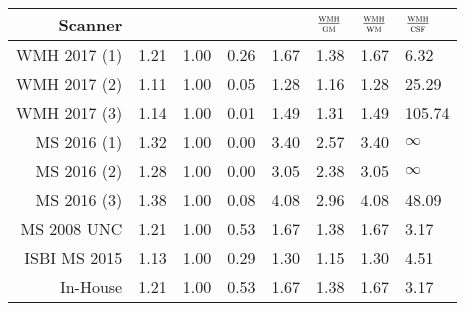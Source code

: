 \begin{tabu} to 0.7\textwidth{rX[c]X[c]X[c]X[c]X[c]X[c]X[c]}\toprule
Scanner      & \gm{} & \wm{} & \csf{} & \wmh{} & $\frac{\textsc{wmh}}{\textsc{gm}}$ & $\frac{\textsc{wmh}}{\textsc{wm}}$ & $\frac{\textsc{wmh}}{\textsc{csf}}$ \\\midrule
WMH 2017 (1) & 1.21 & 1.00 & 0.26 & 1.67 & 1.38 & 1.67 & 6.32\\
WMH 2017 (2) & 1.11 & 1.00 & 0.05 & 1.28 & 1.16 & 1.28 & 25.29\\
WMH 2017 (3) & 1.14 & 1.00 & 0.01 & 1.49 & 1.31 & 1.49 & 105.74\\
MS  2016 (1) & 1.32 & 1.00 & 0.00 & 3.40 & 2.57 & 3.40 & $\infty$\\
MS  2016 (2) & 1.28 & 1.00 & 0.00 & 3.05 & 2.38 & 3.05 & $\infty$\\
MS  2016 (3) & 1.38 & 1.00 & 0.08 & 4.08 & 2.96 & 4.08 & 48.09\\
MS  2008 UNC & 1.21 & 1.00 & 0.53 & 1.67 & 1.38 & 1.67 & 3.17\\
ISBI MS 2015 & 1.13 & 1.00 & 0.29 & 1.30 & 1.15 & 1.30 & 4.51\\
In-House & 1.21 & 1.00 & 0.53 & 1.67 & 1.38 & 1.67 & 3.17\\
\bottomrule\end{tabu}
